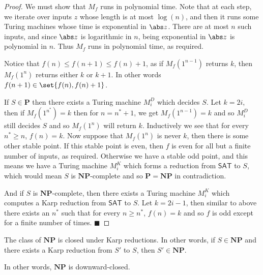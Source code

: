 \documentclass[10pt]{article}
\def\sat{\mathsf{SAT}}
\def\P{\mathbf{P}}
\def\NP{\mathbf{NP}}
\def\qed{%
    \ifmmode%
        \eqno\blacksquare%
    \else%
        \hskip1cm\allowbreak\hbox{}\nobreak\hfill$\blacksquare$%
    \fi%
}
\begin{document}
\begin{proof}
    We must show that $M_f$ runs in polynomial time.
    Note that at each step, we iterate over inputs $z$ whose length is at most $\log(n)$, and then it runs some Turing machines whose time is exponential in $\abs z$.
    There are at most $n$ such inputs, and since $\abs z$ is logarithmic in $n$, being exponential in $\abs z$ is polynomial in $n$.
    Thus $M_f$ runs in polynomial time, as required.

    Notice that $f(n)\leq f(n+1)\leq f(n)+1$, as if $M_f(1^{n-1})$ returns $k$, then $M_f(1^n)$ returns either $k$ or $k+1$.
    In other words $f(n+1)\in\set{f(n),f(n)+1}$.

    If $S\in\P$ then there exists a Turing machine $M_i^D$ which decides $S$.
    Let $k=2i$, then if $M_f(1^{n^*})=k$ then for $n=n^*+1$, we get $M_f(1^{n-1})=k$ and so $M_i^D$ still decides $S$ and so $M_f(1^n)$ will return $k$.
    Inductively we see that for every $n^*\geq n$, $f(n)=k$.
    Now suppose that $M_f(1^n)$ is never $k$, then there is some other stable point.
    If this stable point is even, then $f$ is even for all but a finite number of inputs, as required.
    Otherwise we have a stable odd point, and this means we have a Turing machine $M_i^K$ which forms a reduction from $\sat$ to $S$, which would mean $S$ is $\NP$-complete and so $\P=\NP$ in contradiction.

    And if $S$ is $\NP$-complete, then there exists a Turing machine $M_i^K$ which computes a Karp reduction from $\sat$ to $S$.
    Let $k=2i-1$, then similar to above there exists an $n^*$ such that for every $n\geq n^*$, $f(n)=k$ and so $f$ is odd except for a finite number of times.
    \qed

\end{proof}

\begin{prop*}

    The class of $\NP$ is closed under Karp reductions.
    In other words, if $S\in\NP$ and there exists a Karp reduction from $S'$ to $S$, then $S'\in\NP$.

\end{prop*}

In other words, $\NP$ is downward-closed.
\end{document}
